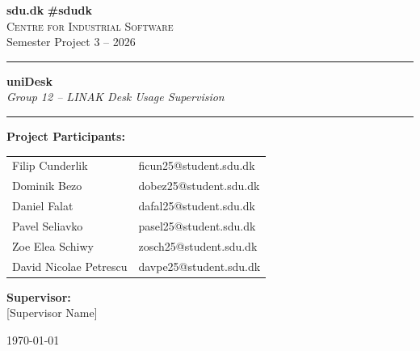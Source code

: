 \documentclass[12pt, a4paper, openany]{report}
\newcommand{\theInstitute}{Centre for Industrial Software}
\newcommand{\theSemester}{Semester Project 3 -- 2026}
\newcommand{\theTitle}{uniDesk}
\newcommand{\theSubtitle}{Group 12 -- LINAK Desk Usage Supervision}
\newcommand{\theSupervisor}{[Supervisor Name]}
\begin{document}
\begin{titlepage}
\pagestyle{empty}

\noindent
{\textbf{sdu.dk} \hfill \textbf{\#sdudk}}\\[0.5cm]
\noindent
{\large \textsc{\theInstitute}}\\[0.2cm]
\noindent
{\large \theSemester}

\vspace{3.5cm}

\begin{center}
\hrule\vspace{0.8cm}
{\huge \textbf{\textcolor{mygrey}{\theTitle}}}\\[0.4cm]
{\Large \textit{\theSubtitle}}
\vspace{0.8cm}\hrule
\end{center}

\vspace{2.2cm}

\begin{center}
{\large \textbf{Project Participants:}}\\[0.4cm]
\begin{tabular}{ll}
Filip Cunderlik & ficun25@student.sdu.dk \\
Dominik Bezo & dobez25@student.sdu.dk \\
Daniel Falat & dafal25@student.sdu.dk \\
Pavel Seliavko & pasel25@student.sdu.dk \\
Zoe Elea Schiwy & zosch25@student.sdu.dk \\
David Nicolae Petrescu & davpe25@student.sdu.dk \\
\end{tabular}

\vspace{1.2cm}

{\large \textbf{Supervisor:}}\\[0.2cm]
{\large \theSupervisor}

\vfill
{\small \today}
\end{center}

\end{titlepage}

\setcounter{page}{2}
\end{document}
